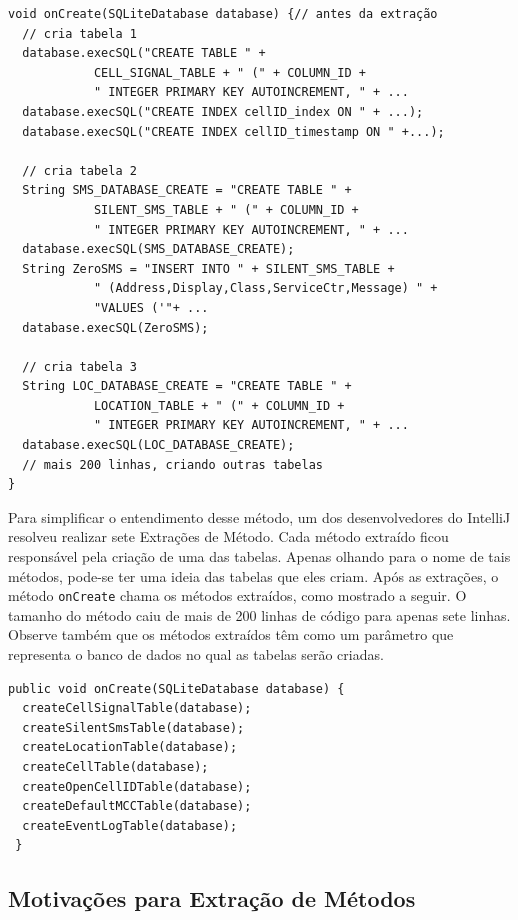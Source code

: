 \documentclass[
  11pt,
  twoside]{book}
\newcommand{\passthrough}[1]{#1}
\begin{document}
\newpage

\begin{lstlisting}
void onCreate(SQLiteDatabase database) {// antes da extração
  // cria tabela 1
  database.execSQL("CREATE TABLE " +
            CELL_SIGNAL_TABLE + " (" + COLUMN_ID +
            " INTEGER PRIMARY KEY AUTOINCREMENT, " + ...
  database.execSQL("CREATE INDEX cellID_index ON " + ...);
  database.execSQL("CREATE INDEX cellID_timestamp ON " +...);

  // cria tabela 2
  String SMS_DATABASE_CREATE = "CREATE TABLE " + 
            SILENT_SMS_TABLE + " (" + COLUMN_ID +
            " INTEGER PRIMARY KEY AUTOINCREMENT, " + ...
  database.execSQL(SMS_DATABASE_CREATE);
  String ZeroSMS = "INSERT INTO " + SILENT_SMS_TABLE + 
            " (Address,Display,Class,ServiceCtr,Message) " +
            "VALUES ('"+ ...
  database.execSQL(ZeroSMS);

  // cria tabela 3
  String LOC_DATABASE_CREATE = "CREATE TABLE " +      
            LOCATION_TABLE + " (" + COLUMN_ID +
            " INTEGER PRIMARY KEY AUTOINCREMENT, " + ...
  database.execSQL(LOC_DATABASE_CREATE);
  // mais 200 linhas, criando outras tabelas
}
\end{lstlisting}

Para simplificar o entendimento desse método, um dos desenvolvedores do
IntelliJ resolveu realizar sete Extrações de Método. Cada método
extraído ficou responsável pela criação de uma das tabelas. Apenas
olhando para o nome de tais métodos, pode-se ter uma ideia das tabelas
que eles criam. Após as extrações, o método
\passthrough{\lstinline!onCreate!} chama os métodos extraídos, como
mostrado a seguir. O tamanho do método caiu de mais de 200 linhas de
código para apenas sete linhas. Observe também que os métodos extraídos
têm como um parâmetro que representa o banco de dados no qual as tabelas
serão criadas.

\begin{lstlisting}
public void onCreate(SQLiteDatabase database) { 
  createCellSignalTable(database);
  createSilentSmsTable(database);
  createLocationTable(database);
  createCellTable(database);
  createOpenCellIDTable(database);
  createDefaultMCCTable(database);
  createEventLogTable(database);
 }
\end{lstlisting}

\hypertarget{motivauxe7uxf5es-para-extrauxe7uxe3o-de-muxe9todos}{%
\subsection{Motivações para Extração de
Métodos}\label{motivauxe7uxf5es-para-extrauxe7uxe3o-de-muxe9todos}}
\end{document}
